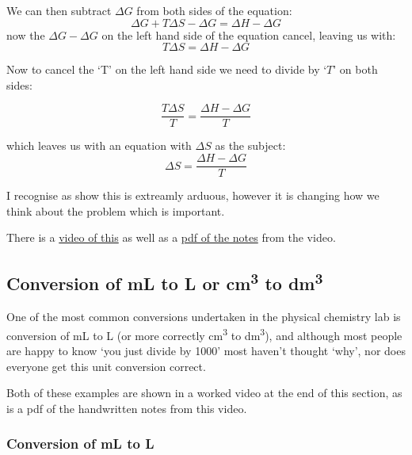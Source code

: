 \documentclass[
]{book}
\begin{document}
We can then subtract \(\Delta G\) from both sides of the equation:
\begin{equation*}
\Delta G + T \Delta S -\Delta G = \Delta H -\Delta G
\end{equation*}
now the \(\Delta G -\Delta G\) on the left hand side of the equation cancel, leaving us with:
\begin{equation*}
T \Delta S = \Delta H -\Delta G
\end{equation*}

Now to cancel the `T' on the left hand side we need to divide by `\(T\)' on both sides:

\begin{equation*}
\frac{T \Delta S}{T} = \frac{\Delta H -\Delta G}{T}
\end{equation*}

which leaves us with an equation with \(\Delta S\) as the subject:
\begin{equation*}
\Delta S = \frac{\Delta H -\Delta G}{T}
\end{equation*}

I recognise as show this is extreamly arduous, however it is changing how we think about the problem which is important.

There is a \href{https://youtu.be/EKThFzuncTI}{video of this} as well as a \href{http://workitoutwithapencil.xyz/wp-content/uploads/2021/07/Rearranging-equations-.pdf}{pdf of the notes} from the video.

\hypertarget{conversion-of-ml-to-l-or-cm3-to-dm3}{%
\subsection{\texorpdfstring{Conversion of mL to L or cm\textsuperscript{3} to dm\textsuperscript{3}}{Conversion of mL to L or cm3 to dm3}}\label{conversion-of-ml-to-l-or-cm3-to-dm3}}

One of the most common conversions undertaken in the physical chemistry lab is conversion of mL to L (or more correctly cm\textsuperscript{3} to dm\textsuperscript{3}), and although most people are happy to know `you just divide by 1000' most haven't thought `why', nor does everyone get this unit conversion correct.

Both of these examples are shown in a worked video at the end of this section, as is a pdf of the handwritten notes from this video.

\hypertarget{conversion-of-ml-to-l}{%
\subsubsection{Conversion of mL to L}\label{conversion-of-ml-to-l}}
\end{document}
